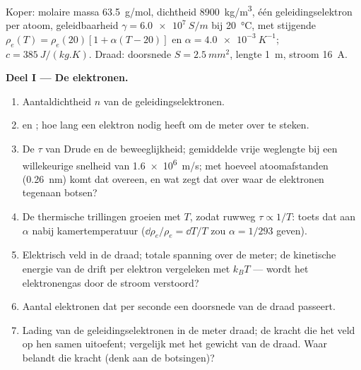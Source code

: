 \begin{problem}
\label{pb:b2:charges-currents-conduction:1}

Koper: molaire massa \qty{63.5}{g/mol}, dichtheid \qty{8900}{kg/m^3}, één
geleidingselektron per atoom, geleidbaarheid $\gamma = \qty{6.0e7}{S/m}$ bij
\qty{20}{\degreeCelsius}, met stijgende 
$\rho_e(T) = \rho_e(20)[1 +
\alpha(T - 20)]$ en
$\alpha = \qty{4.0e-3}{K^{-1}}$; $c = \qty{385}{J/(kg.K)}$. Draad: doorsnede
$S = \qty{2.5}{mm^2}$, lengte \qty{1}{m}, stroom \qty{16}{A}.

\medskip
\noindent\textbf{Deel I --- De elektronen.}
\begin{enumerate}
  \item Aantaldichtheid $n$ van de geleidingselektronen.
  \item {} en ; hoe lang een elektron nodig heeft
        om de meter over te steken.
  \item De $\tau$ van Drude en de beweeglijkheid; gemiddelde vrije weglengte
        bij een willekeurige snelheid van \qty{1.6e6}{m/s}; met hoeveel
        atoomafstanden (\qty{0.26}{nm}) komt dat overeen, en wat zegt dat
        over waar de elektronen tegenaan botsen?
  \item De thermische trillingen groeien met $T$, zodat ruwweg
        $\tau \propto 1/T$: toets dat aan $\alpha$ nabij kamertemperatuur
        ($\dd\rho_e/\rho_e =
        \dd T/T$ zou $\alpha = 1/293$ geven).
  \item Elektrisch veld in de draad; totale spanning over de meter; de
        kinetische energie van de drift per elektron vergeleken met $k_BT$
        --- wordt het elektronengas door de stroom verstoord?
  \item Aantal elektronen dat per seconde een doorsnede van de draad passeert.
  \item Lading van de geleidingselektronen in de meter draad; de kracht die
        het veld op hen samen uitoefent; vergelijk met het gewicht van de
        draad. Waar belandt die kracht (denk aan de botsingen)?
\end{enumerate}


\end{problem}
